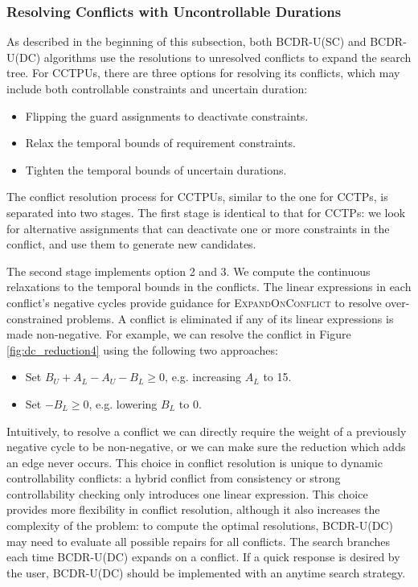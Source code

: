 \documentclass[jair,twoside,11pt,theapa]{article}
\begin{document}
\subsubsection{Resolving Conflicts with Uncontrollable Durations}

As described in the beginning of this subsection, both BCDR-U(SC) and BCDR-U(DC) algorithms use the resolutions to
unresolved conflicts to expand the search tree. For CCTPUs, there are three
options for resolving its conflicts, which may include both controllable
constraints and uncertain duration:

\begin{itemize}
	\item Flipping the guard assignments to deactivate constraints.
	
	\item Relax the temporal bounds of requirement constraints.
	
	\item Tighten the temporal bounds of uncertain durations.
\end{itemize}


The conflict resolution process for CCTPUs, similar to the one for CCTPs, is 
separated into two stages. The first stage is identical to that for CCTPs: we
look for alternative assignments that can deactivate one or more constraints in
the conflict, and use them to generate new candidates.

The second stage implements option 2 and 3. We compute the continuous
relaxations to the temporal bounds in the conflicts. The linear expressions
in each conflict's negative cycles provide guidance for \textsc{ExpandOnConflict} to resolve
over-constrained problems. A conflict is eliminated if any of its linear
expressions is made non-negative. For example, we can resolve the conflict in
Figure \ref{fig:dc_reduction4} using the following two approaches:


\begin{itemize}
	\item Set $B_U+A_L-A_U-B_L \geq 0$, e.g. increasing $A_L$ to 15.
	\item Set $-B_L \geq 0$, e.g. lowering  $B_L$ to 0.
\end{itemize}


Intuitively, to resolve a conflict we can directly require the weight of a
previously negative cycle to be non-negative, or we can make sure the reduction
which adds an edge never occurs. This choice in conflict resolution is unique to
dynamic controllability conflicts: a hybrid conflict from consistency or strong
controllability checking only introduces one linear expression. This choice
provides more flexibility in conflict resolution, although it also increases the
complexity of the problem: to compute the optimal resolutions, BCDR-U(DC) may
need to evaluate all possible repairs for all conflicts. The search branches
each time BCDR-U(DC) expands on a conflict. If a quick response is desired by
the user, BCDR-U(DC) should be implemented with an anytime search strategy.
\end{document}
